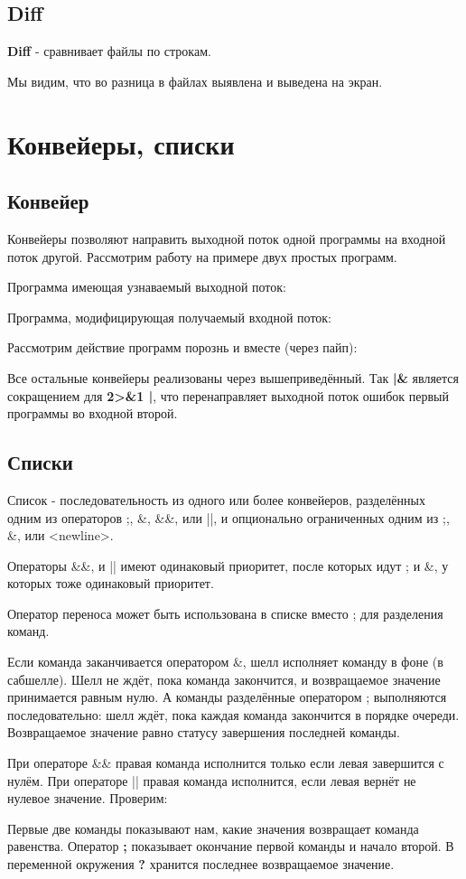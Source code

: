 \documentclass[a4paper]{article}
\begin{document}
\subsection{Diff}
\textbf{Diff} - сравнивает файлы по строкам.

Мы видим, что во разница в файлах выявлена и выведена на экран.

 
\section{Конвейеры, списки}
\subsection{Конвейер}
Конвейеры позволяют направить выходной поток одной программы на входной поток другой. Рассмотрим работу на примере двух простых программ.

Программа имеющая узнаваемый выходной поток:


Программа, модифицирующая получаемый входной поток:


Рассмотрим действие программ порознь и вместе (через пайп):


Все остальные конвейеры реализованы через вышеприведённый. Так \textbf{|\&} является сокращением для \textbf{2>\&1 |}, что перенаправляет выходной поток ошибок первый программы во входной второй.

\subsection{Списки}
Список - последовательность из одного или более конвейеров, разделённых одним из операторов ;, \&, \&\&, или ||, и опционально ограниченных одним из ;, \&, или <newline>.

Операторы \&\&, и || имеют одинаковый приоритет, после которых идут ; и \&, у которых тоже одинаковый приоритет.

Оператор переноса может быть использована в списке вместо ; для разделения команд.

Если команда заканчивается оператором \&, шелл исполняет команду в фоне (в сабшелле). Шелл не ждёт, пока команда закончится, и возвращаемое значение принимается равным нулю. А команды разделённые оператором ; выполняются последовательно: шелл ждёт, пока каждая команда закончится в порядке очереди. Возвращаемое значение равно статусу завершения последней команды.

При операторе \&\& правая команда исполнится только если левая завершится с нулём.
При операторе || правая команда исполнится, если левая вернёт не нулевое значение. Проверим:

Первые две команды показывают нам, какие значения возвращает команда равенства. Оператор \textbf{;} показывает окончание первой команды и начало второй. В переменной окружения \textbf{?} хранится последнее возвращаемое значение.
\end{document}
